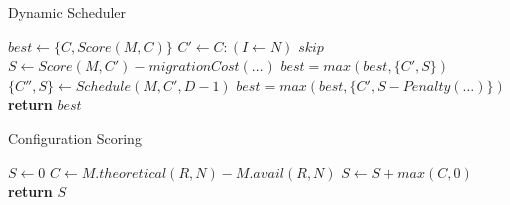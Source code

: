 
\begin{algorithm}[h]
\caption{Dynamic Scheduler}
\label{algo:sched}
\footnotesize
\begin{algorithmic}[1]
    \State $best \gets \{C,Score(M,C)\}$%
        \State $C' \gets C : (I \gets N)$
            \State $skip$
        \EndIf
        \State $S \gets Score(M,C') - migrationCost(\dots)$
        \State $best = max(best,\{C',S\})$
        \State $\{C'',S\} \gets Schedule(M,C',D-1)$
        \State $best = max(best,\{C', S - Penalty(\dots)\})$
        \EndIf
    \EndFor
    \State \textbf{return} $best$
\EndProcedure
\end{algorithmic}
\normalsize
\end{algorithm}

\begin{algorithm}[h]
\caption{Configuration Scoring}
\label{algo:score}
\footnotesize
\begin{algorithmic}[1]
    \State $S \gets 0$
        \State $C \gets M.theoretical(R,N) - M.avail(R,N)$
        \State $S \gets S + max(C,0)$ \label{algo:scoremax}
    \EndFor
    \State \textbf{return} $S$
\EndProcedure
\end{algorithmic}
\normalsize
\end{algorithm}
